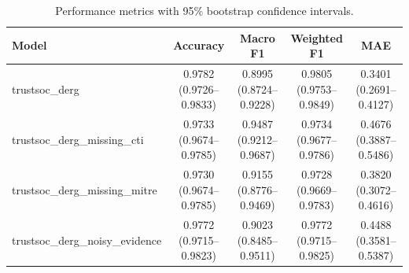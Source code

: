 \begin{table}[htbp]
\centering
\caption{Performance metrics with 95\% bootstrap confidence intervals.}
\label{tab:confidence_intervals}
\begin{tabular}{lcccc}
\toprule
\textbf{Model} & \textbf{Accuracy} & \textbf{Macro F1} & \textbf{Weighted F1} & \textbf{MAE} \\
\midrule
trustsoc_derg & 0.9782 (0.9726–0.9833) & 0.8995 (0.8724–0.9228) & 0.9805 (0.9753–0.9849) & 0.3401 (0.2691–0.4127) \\
trustsoc_derg_missing_cti & 0.9733 (0.9674–0.9785) & 0.9487 (0.9212–0.9687) & 0.9734 (0.9677–0.9786) & 0.4676 (0.3887–0.5486) \\
trustsoc_derg_missing_mitre & 0.9730 (0.9674–0.9785) & 0.9155 (0.8776–0.9469) & 0.9728 (0.9669–0.9783) & 0.3820 (0.3072–0.4616) \\
trustsoc_derg_noisy_evidence & 0.9772 (0.9715–0.9823) & 0.9023 (0.8485–0.9511) & 0.9772 (0.9715–0.9825) & 0.4488 (0.3581–0.5387) \\
\bottomrule
\end{tabular}
\end{table}